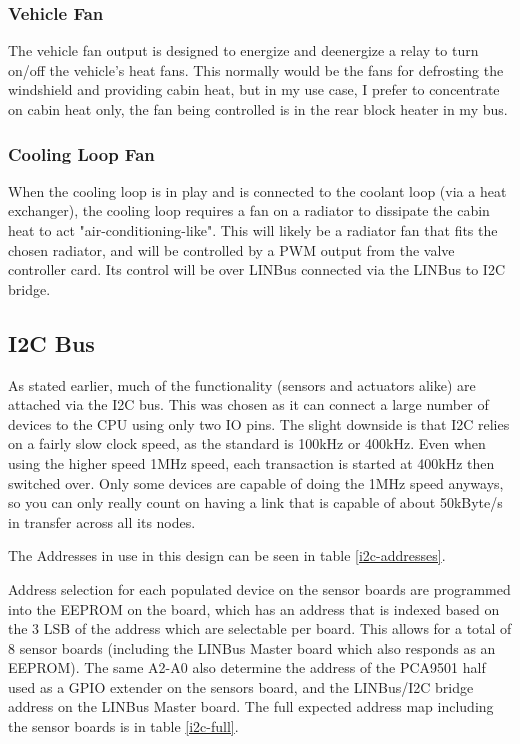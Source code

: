 \documentclass[lettersize,journal]{IEEEtran}
\begin{document}
\subsubsection{Vehicle Fan}
The vehicle fan output is designed to energize and deenergize a relay to turn on/off the vehicle's heat fans.  This normally would be the fans for defrosting the windshield and providing cabin heat, but in my use case, I prefer to concentrate on cabin heat only, the fan being controlled is in the rear block heater in my bus.

\subsubsection{Cooling Loop Fan}
When the cooling loop is in play and is connected to the coolant loop (via a heat exchanger), the cooling loop requires a fan on a radiator to dissipate the cabin heat to act "air-conditioning-like".  This will likely be a radiator fan that fits the chosen radiator, and will be controlled by a PWM output from the valve controller card.  Its control will be over LINBus connected via the LINBus to I2C bridge.

\subsection{I2C Bus}

As stated earlier, much of the functionality (sensors and actuators alike) are attached via the I2C bus.  This was chosen as it can connect a large number of devices to the CPU using only two IO pins.  The slight downside is that I2C relies on a fairly slow clock speed, as the standard is 100kHz or 400kHz.  Even when using the higher speed 1MHz speed, each transaction is started at 400kHz then switched over.  Only some devices are capable of doing the 1MHz speed anyways, so you can only really count on having a link that is capable of about 50kByte/s in transfer across all its nodes.

The Addresses in use in this design can be seen in table \ref{i2c-addresses}.

Address selection for each populated device on the sensor boards are programmed into the EEPROM on the board, which has an address that is indexed based on the 3 LSB of the address which are selectable per board.  This allows for a total of 8 sensor boards (including the LINBus Master board which also responds as an EEPROM).  The same A2-A0 also determine the address of the PCA9501 half used as a GPIO extender on the sensors board, and the LINBus/I2C bridge address on the LINBus Master board.  The full expected address map including the sensor boards is in table \ref{i2c-full}.
\end{document}
